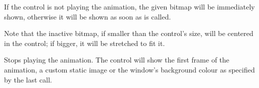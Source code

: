 If the control is not playing the animation, the given bitmap will be immediately
shown, otherwise it will be shown as soon as 
is called.

Note that the inactive bitmap, if smaller than the control's size, will be centered in
the control; if bigger, it will be stretched to fit it.


\label{wxanimationctrlstop}


Stops playing the animation.
The control will show the first frame of the animation, a custom static image or
the window's background colour as specified by the
last  call.

